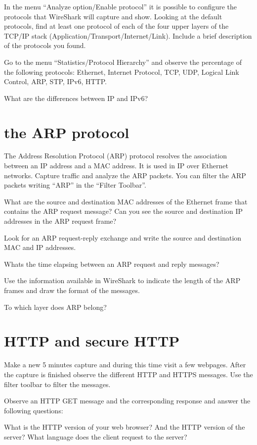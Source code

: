 In the menu ``Analyze option/Enable protocol'' it is possible to configure the protocols that WireShark will capture and show.
Looking at the default protocols, find at least one protocol of each of the four upper layers of the TCP/IP stack (Application/Transport/Internet/Link).
Include a brief description of the protocols you found.

Go to the menu ``Statistics/Protocol Hierarchy'' and observe the percentage of the following protocols: Ethernet, Internet Protocol, TCP, UDP, Logical Link Control, ARP, STP, IPv6, HTTP.

What are the differences between IP and IPv6?

\section{the ARP protocol}
The Address Resolution Protocol (ARP) protocol resolves the association between an IP address and a MAC address.
It is used in IP over Ethernet networks.
Capture traffic and analyze the ARP packets.
You can filter the ARP packets writing ``ARP'' in the ``Filter Toolbar''.

What are the source and destination MAC addresses of the Ethernet frame that contains the ARP request message?
Can you see the source and destination IP addresses in the ARP request frame?

Look for an ARP request-reply exchange and write the source and destination MAC and IP addresses.

Whats the time elapsing between an ARP request and reply messages?

Use the information available in WireShark to indicate the length of the ARP frames and draw the format of the messages.

To which layer does ARP belong?

\section{HTTP and secure HTTP}

Make a new 5 minutes capture and during this time visit a few webpages.
After the capture is finished observe the different HTTP and HTTPS messages.
Use the filter toolbar to filter the messages.

Observe an HTTP GET message and the corresponding response and answer the following questions:

What is the HTTP version of your web browser?
And the HTTP version of the server?
What language does the client request to the server?

